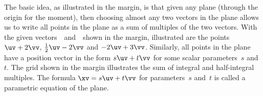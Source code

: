 The basic idea, as illustrated in the margin, is that given any plane (through the origin for the moment), then choosing almost any two vectors in the plane allows us to write all points in the plane as a sum of multiples of the two vectors.
With the given vectors~\uv\ and~\vv\ shown in the margin, illustrated are the points \(\uv+2\vv\), \(\tfrac12\uv-2\vv\) and \(-2\uv+3\vv\).
%
Similarly, all points in the plane have a position vector in the form \(s\uv+t\vv\) for some scalar parameters~\(s\) and~\(t\).
The grid shown in the margin illustrates the sum of integral and half-integral multiples.
The formula \(\xv=s\uv+t\vv\) for parameters~\(s\) and~\(t\) is called a parametric equation of the plane.

